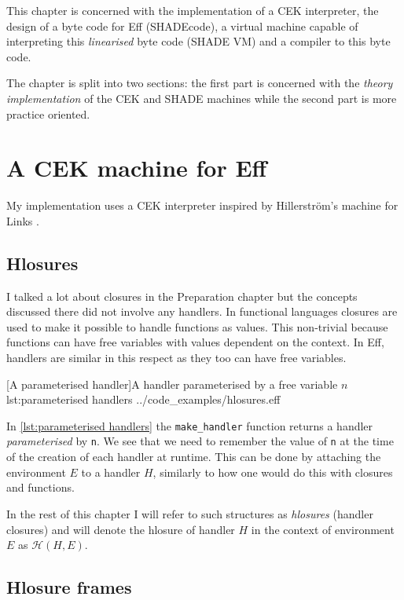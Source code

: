 \documentclass[class=article, crop=false]{standalone}
\begin{document}
This chapter is concerned with the implementation of a CEK interpreter, the
design of a byte code for Eff (SHADEcode), a virtual machine capable of
interpreting this \emph{linearised} byte code (SHADE VM) and a compiler to this byte
code.

The chapter is split into two sections: the first part is concerned with the
\emph{theory implementation} of the CEK and SHADE machines while the second part
is more practice oriented.

\section{A CEK machine for Eff}

My implementation uses a CEK interpreter inspired by Hillerström's
machine for Links \cite{hillerstrom2016compilation}.

\subsection{Hlosures}

I talked a lot about closures in the Preparation chapter but the concepts
discussed there did not involve any handlers. In functional languages closures
are used to make it possible to handle functions as values. This non-trivial
because functions can have free variables with values 
dependent on the context. In Eff, handlers are similar in this respect
as they too can have free variables.

{[A parameterised handler]A handler parameterised by a free variable $n$}
{lst:parameterised handlers}
{../code_examples/hlosures.eff}

In \autoref{lst:parameterised handlers} the \lstinline|make_handler| function
returns a handler \emph{parameterised} by \lstinline|n|. We see that we need to
remember the value of \verb|n| at the time of the creation of each handler
at runtime. This can be done by attaching the environment $E$ to a handler $H$,
similarly to how one would do this with closures and functions.

In the rest of this chapter I will refer to such structures as \emph{hlosures}
(handler closures) and will denote the hlosure of handler $H$ in the context of
environment $E$ as $\mathcal{H}(H, E)$.

\subsection{Hlosure frames}
\end{document}
